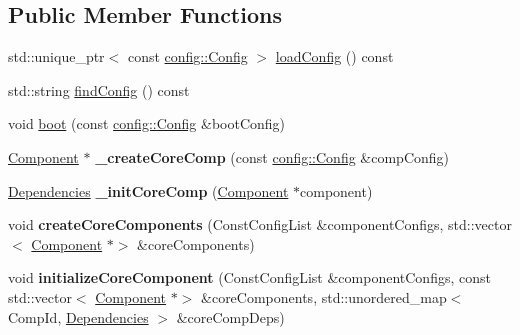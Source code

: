 \subsection*{Public Member Functions}
\begin{DoxyCompactItemize}
\item 
std\+::unique\+\_\+ptr$<$ const \hyperlink{classtheoria_1_1config_1_1Config}{config\+::\+Config} $>$ \hyperlink{classtheoria_1_1core_1_1Bootstrap_a3ed8e5694e2a5d9136ad00c8eeb13022}{load\+Config} () const
\item 
std\+::string \hyperlink{classtheoria_1_1core_1_1Bootstrap_a8bc0d6ee72439172ca309df9fb7bf094}{find\+Config} () const
\item 
void \hyperlink{classtheoria_1_1core_1_1Bootstrap_acfcc189dd0c09ed9052917ef7ce24565}{boot} (const \hyperlink{classtheoria_1_1config_1_1Config}{config\+::\+Config} \&boot\+Config)
\item 
\mbox{\label{classtheoria_1_1core_1_1Bootstrap_a6154c7bce057f6fe41a98ab52b33b32e}} 
\hyperlink{classtheoria_1_1core_1_1Component}{Component} $\ast$ {\bfseries \+\_\+create\+Core\+Comp} (const \hyperlink{classtheoria_1_1config_1_1Config}{config\+::\+Config} \&comp\+Config)
\item 
\mbox{\label{classtheoria_1_1core_1_1Bootstrap_a0b53268afd49fabdba3fa2bd7705bbfa}} 
\hyperlink{classtheoria_1_1core_1_1Dependencies}{Dependencies} {\bfseries \+\_\+init\+Core\+Comp} (\hyperlink{classtheoria_1_1core_1_1Component}{Component} $\ast$component)
\item 
\mbox{\label{classtheoria_1_1core_1_1Bootstrap_a7579f7dd6c9304a317e01123ba2636a7}} 
void {\bfseries create\+Core\+Components} (Const\+Config\+List \&component\+Configs, std\+::vector$<$ \hyperlink{classtheoria_1_1core_1_1Component}{Component} $\ast$$>$ \&core\+Components)
\item 
\mbox{\label{classtheoria_1_1core_1_1Bootstrap_a664811a1d1de36276864160f56c12a19}} 
void {\bfseries initialize\+Core\+Component} (Const\+Config\+List \&component\+Configs, const std\+::vector$<$ \hyperlink{classtheoria_1_1core_1_1Component}{Component} $\ast$$>$ \&core\+Components, std\+::unordered\+\_\+map$<$ Comp\+Id, \hyperlink{classtheoria_1_1core_1_1Dependencies}{Dependencies} $>$ \&core\+Comp\+Deps)

\end{DoxyCompactItemize}
